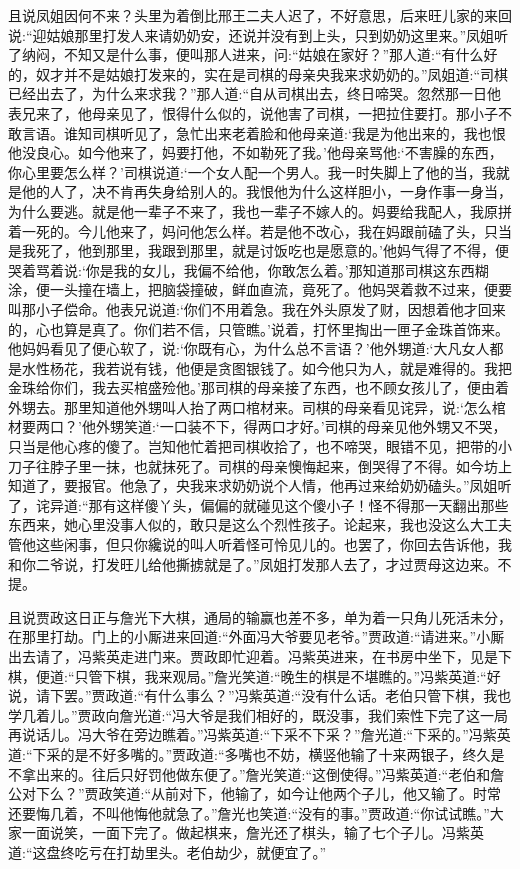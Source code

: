 \begin{parag}
    且说凤姐因何不来？头里为着倒比邢王二夫人迟了，不好意思，后来旺儿家的来回说:“迎姑娘那里打发人来请奶奶安，还说并没有到上头，只到奶奶这里来。”凤姐听了纳闷，不知又是什么事，便叫那人进来，问:“姑娘在家好？”那人道:“有什么好的，奴才并不是姑娘打发来的，实在是司棋的母亲央我来求奶奶的。”凤姐道:“司棋已经出去了，为什么来求我？”那人道:“自从司棋出去，终日啼哭。忽然那一日他表兄来了，他母亲见了，恨得什么似的，说他害了司棋，一把拉住要打。那小子不敢言语。谁知司棋听见了，急忙出来老着脸和他母亲道:‘我是为他出来的，我也恨他没良心。如今他来了，妈要打他，不如勒死了我。’他母亲骂他:‘不害臊的东西，你心里要怎么样？’司棋说道:‘一个女人配一个男人。我一时失脚上了他的当，我就是他的人了，决不肯再失身给别人的。我恨他为什么这样胆小，一身作事一身当，为什么要逃。就是他一辈子不来了，我也一辈子不嫁人的。妈要给我配人，我原拼着一死的。今儿他来了，妈问他怎么样。若是他不改心，我在妈跟前磕了头，只当是我死了，他到那里，我跟到那里，就是讨饭吃也是愿意的。’他妈气得了不得，便哭着骂着说:‘你是我的女儿，我偏不给他，你敢怎么着。’那知道那司棋这东西糊涂，便一头撞在墙上，把脑袋撞破，鲜血直流，竟死了。他妈哭着救不过来，便要叫那小子偿命。他表兄说道:‘你们不用着急。我在外头原发了财，因想着他才回来的，心也算是真了。你们若不信，只管瞧。’说着，打怀里掏出一匣子金珠首饰来。他妈妈看见了便心软了，说:‘你既有心，为什么总不言语？’他外甥道:‘大凡女人都是水性杨花，我若说有钱，他便是贪图银钱了。如今他只为人，就是难得的。我把金珠给你们，我去买棺盛殓他。’那司棋的母亲接了东西，也不顾女孩儿了，便由着外甥去。那里知道他外甥叫人抬了两口棺材来。司棋的母亲看见诧异，说:‘怎么棺材要两口？’他外甥笑道:‘一口装不下，得两口才好。’司棋的母亲见他外甥又不哭，只当是他心疼的傻了。岂知他忙着把司棋收拾了，也不啼哭，眼错不见，把带的小刀子往脖子里一抹，也就抹死了。司棋的母亲懊悔起来，倒哭得了不得。如今坊上知道了，要报官。他急了，央我来求奶奶说个人情，他再过来给奶奶磕头。”凤姐听了，诧异道:“那有这样傻丫头，偏偏的就碰见这个傻小子！怪不得那一天翻出那些东西来，她心里没事人似的，敢只是这么个烈性孩子。论起来，我也没这么大工夫管他这些闲事，但只你纔说的叫人听着怪可怜见儿的。也罢了，你回去告诉他，我和你二爷说，打发旺儿给他撕掳就是了。”凤姐打发那人去了，才过贾母这边来。不提。
\end{parag}


\begin{parag}
    且说贾政这日正与詹光下大棋，通局的输赢也差不多，单为着一只角儿死活未分，在那里打劫。门上的小厮进来回道:“外面冯大爷要见老爷。”贾政道:“请进来。”小厮出去请了，冯紫英走进门来。贾政即忙迎着。冯紫英进来，在书房中坐下，见是下棋，便道:“只管下棋，我来观局。”詹光笑道:“晚生的棋是不堪瞧的。”冯紫英道:“好说，请下罢。”贾政道:“有什么事么？”冯紫英道:“没有什么话。老伯只管下棋，我也学几着儿。”贾政向詹光道:“冯大爷是我们相好的，既没事，我们索性下完了这一局再说话儿。冯大爷在旁边瞧着。”冯紫英道:“下采不下采？”詹光道:“下采的。”冯紫英道:“下采的是不好多嘴的。”贾政道:“多嘴也不妨，横竖他输了十来两银子，终久是不拿出来的。往后只好罚他做东便了。”詹光笑道:“这倒使得。”冯紫英道:“老伯和詹公对下么？”贾政笑道:“从前对下，他输了，如今让他两个子儿，他又输了。时常还要悔几着，不叫他悔他就急了。”詹光也笑道:“没有的事。”贾政道:“你试试瞧。”大家一面说笑，一面下完了。做起棋来，詹光还了棋头，输了七个子儿。冯紫英道:“这盘终吃亏在打劫里头。老伯劫少，就便宜了。”
\end{parag}


